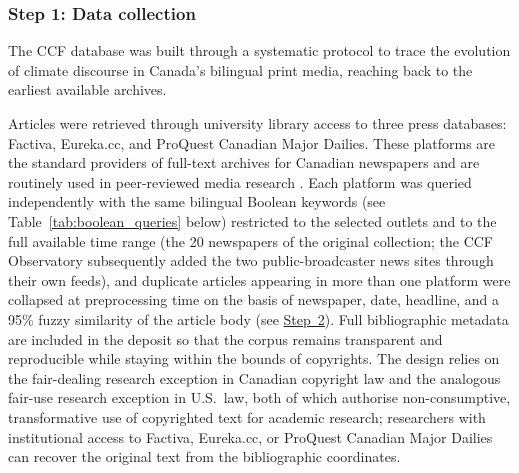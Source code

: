 \documentclass[12pt]{article}
\renewcommand\_{\texttt{\detokenize{_}\allowbreak}}
\begin{document}
\subsubsection{Step 1: Data collection}

The CCF database was built through a systematic protocol to trace the evolution of climate discourse in Canada's bilingual print media, reaching back to the earliest available archives.

Articles were retrieved through university library access to three press databases: Factiva, Eureka.cc, and ProQuest Canadian Major Dailies. These platforms are the standard providers of full-text archives for Canadian newspapers and are routinely used in peer-reviewed media research \autocite{young_comparing_2012, king_how_2019, meddeb_counteracting_2022}. Each platform was queried independently with the same bilingual Boolean keywords (see Table~\ref{tab:boolean_queries} below) restricted to the selected outlets and to the full available time range (the 20 newspapers of the original collection; the CCF Observatory subsequently added the two public-broadcaster news sites through their own feeds), and duplicate articles appearing in more than one platform were collapsed at preprocessing time on the basis of newspaper, date, headline, and a 95\% fuzzy similarity of the article body (see \hyperref[subsec:step2_preprocessing]{Step~2}). Full bibliographic metadata are included in the deposit so that the corpus remains transparent and reproducible while staying within the bounds of copyrights. The design relies on the fair-dealing research exception in Canadian copyright law and the analogous fair-use research exception in U.S.\ law, both of which authorise non-consumptive, transformative use of copyrighted text for academic research; researchers with institutional access to Factiva, Eureka.cc, or ProQuest Canadian Major Dailies can recover the original text from the bibliographic coordinates.
\end{document}
